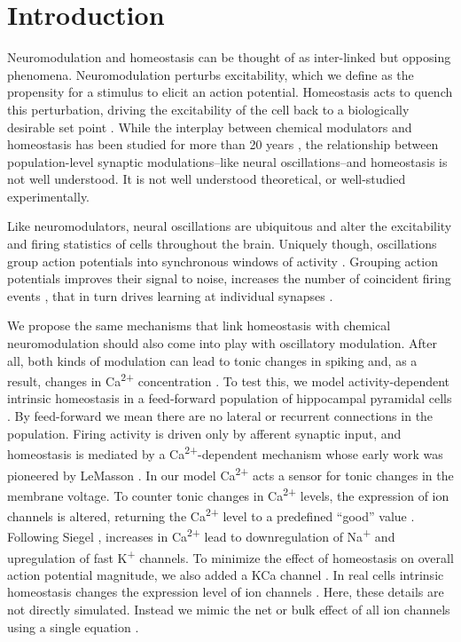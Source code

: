 \documentclass{article}
\begin{document}
\section*{Introduction}
\lettrine[loversize=0,nindent=0,realheight=true]{N}{}euromodulation and homeostasis can be thought of as inter-linked but opposing phenomena. Neuromodulation perturbs excitability, which we define as the propensity for a stimulus to elicit an action potential. Homeostasis acts to quench this perturbation, driving the excitability of the cell back to a biologically desirable set point \cite{LeMasson1993,Abbott1993}. While the interplay between chemical modulators and homeostasis has been studied for more than 20 years \cite{LeMasson1993,Abbott1993,Golowasch1999,Marder2014,Marder2015,Gutierrez2013}, the relationship between population-level synaptic modulations--like neural oscillations--and homeostasis is not well understood. It is not well understood theoretical, or well-studied experimentally.

Like neuromodulators, neural oscillations are ubiquitous and alter the excitability and firing statistics of cells throughout the brain. Uniquely though, oscillations group action potentials into synchronous windows of activity \cite{Lisman2013,Voytek2015}. Grouping action potentials improves their signal to noise, increases the number of coincident firing events \cite{Chen2013,Zhou2015,Voytek2015a,Peterson2017}, that in turn drives learning at individual synapses \cite{Muller2011,Song2000,Markram1997}.

We propose the same mechanisms that link homeostasis with chemical neuromodulation should also come into play with oscillatory modulation. After all, both kinds of modulation can lead to tonic changes in spiking and, as a result, changes in Ca\textsuperscript{2+} concentration \cite{Liu1998}. 
To test this, we model activity-dependent intrinsic homeostasis in a feed-forward population of hippocampal pyramidal cells \cite{Siegel1994}. By feed-forward we mean there are no lateral or recurrent connections in the population. Firing activity is driven only by afferent synaptic input, and homeostasis is mediated by a Ca\textsuperscript{2+}-dependent mechanism \cite{Golowasch1999,Marder2014,Marder2015,Gutierrez2013,OLeary2014} whose early work was pioneered by LeMasson \cite{LeMasson1993,Abbott1993}. In our model Ca\textsuperscript{2+} acts a sensor for tonic changes in the membrane voltage. To counter tonic changes in Ca\textsuperscript{2+} levels, the expression of ion channels is altered, returning the Ca\textsuperscript{2+} level to a predefined ``good'' value \cite{Golowasch1999,OLeary2013}. Following Siegel \cite{Siegel1994}, increases in Ca\textsuperscript{2+} lead to downregulation of Na\textsuperscript{+} and upregulation of fast K\textsuperscript{+} channels. To minimize the effect of homeostasis on overall action potential magnitude, we also added a KCa channel \citep{Siegel1994}. In real cells intrinsic homeostasis changes the expression level of ion channels \cite{OLeary2013}. Here, these details are not directly simulated. Instead we mimic the net or bulk effect of all ion channels using a single equation \cite{LeMasson1993,OLeary2013,OLeary2014}.
\end{document}

